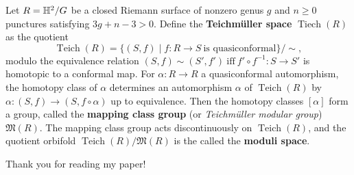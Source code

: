         Let $R= \mathbb{H} ^2/ G$ be a closed Riemann surface of nonzero genus $g$ and $n\geq 0$ punctures satisfying $3g+n-3>0$. Define the \textbf{Teichm\"uller space} $\operatorname{Tiech}(R)$ as the quotient \[
            \operatorname{Teich}(R) =\{(S,f) \mid f \colon R \to S \ \text{is quasiconformal}\} / \sim,
        \] modulo the equivalence relation $(S,f)\sim (S',f') \ \text{iff} \ f' \circ f^{-1} \colon S \to S'$ is homotopic to a conformal map. For $\alpha  \colon R \to R$ a quasiconformal automorphism, the homotopy class of $\alpha $ determines an automorphism $\alpha $ of $\operatorname{Teich}(R)$ by $\alpha  \colon (S,f) \to (S,f \circ \alpha )$ up to equivalence. Then the homotopy classes $[\alpha ]$ form a group, called the \textbf{mapping class group} (or \emph{Teichm\"uller modular group}) $\mathfrak M(R)$. The mapping class group acts discontinuously on $\operatorname{Teich}(R)$, and the quotient orbifold $\operatorname{Teich}(R) / \mathfrak M(R)$ is the called the \textbf{moduli space}.

\orbreak
Thank you for reading my paper!
